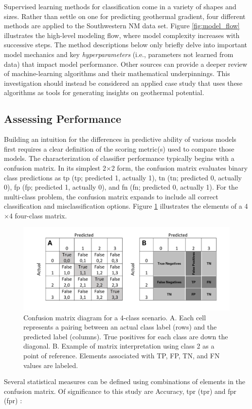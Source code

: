 Supervised learning methods for classification come in a variety of shapes and sizes. Rather than settle on one for predicting geothermal gradient, four different methods are applied to the Southwestern NM data set. Figure \ref{fig:model_flow} illustrates the high-level modeling flow, where model complexity increases with successive steps. The method descriptions below only briefly delve into important model mechanics and key \textit{hyperparameters} (i.e., parameters not learned from data) that impact model performance. Other sources can provide a deeper review of machine-learning algorithms and their mathematical underpinnings. This investigation should instead be considered an applied case study that uses these algorithms as tools for generating insights on geothermal potential.

\subsection{Assessing Performance}\label{ch3:modeling_assessments}
Building an intuition for the differences in predictive ability of various models first requires a clear definition of the scoring metric(s) used to compare those models. The characterization of classifier performance typically begins with a confusion matrix. In its simplest 2$\times$2 form, the confusion matrix evaluates binary class predictions as \acrlong{tp} (\acrshort{tp}; predicted 1, actually 1), \acrlong{tn} (\acrshort{tn}; predicted 0, actually 0), \acrlong{fp} (\acrshort{fp}; predicted 1, actually 0), and \acrlong{fn} (\acrshort{fn}; predicted 0, actually 1). For the multi-class problem, the confusion matrix expands to include all correct classification and misclassification options. Figure \ref{fig:confusion_matrix} illustrates the elements of a 4$\times$4 four-class matrix.

\begin{figure}[!htp]
\centering
\includegraphics[width=\textwidth]{templates/images/Figure-Confusion_Matrix.png}
\caption[Example four-class confusion matrix]{Confusion matrix diagram for a 4-class scenario. A. Each cell represents a pairing between an actual class label (rows) and the predicted label (columns). True positives for each class are down the diagonal. B. Example of matrix interpretation using class 2 as a point of reference. Elements associated with TP, FP, TN, and FN values are labeled.}
\label{fig:confusion_matrix}
\end{figure}
Several statistical measures can be defined using combinations of elements in the confusion matrix. Of significance to this study are Accuracy, \acrlong{tpr} (\acrshort{tpr}) and \acrlong{fpr} (\acrshort{fpr}) \citep{tharwat_classification_2020}:

